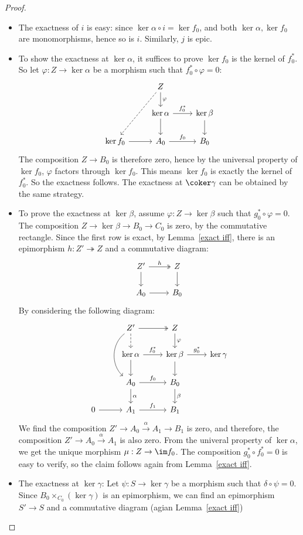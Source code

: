 \begin{proof}
\begin{itemize}
\item The exactness of $i$ is easy: since  $\ker\alpha\circ i=\ker f_0$, and both $\ker\alpha,\ker f_0$ are monomorphisms, hence so is $i$. Similarly, $j$ is epic.
\item To show the exactness at $\ker\alpha$, it suffices to prove $\ker f_0$ is the kernel of $f_0^*$. So let $\varphi:Z\to\ker\alpha$ be a morphism such that $f_0^*\circ\varphi=0$:
\[\begin{tikzcd}
&Z\ar[d,"\varphi"]\ar[ddl,dashed]&\\
&\ker\alpha\ar[r,"f_0^*"]\ar[d]&\ker\beta\ar[d]\\
\ker f_0\ar[r]&A_0\ar[r,"f_0"]&B_0
\end{tikzcd}\]
The composition $Z\to B_0$ is therefore zero, hence by the universal property of $\ker f_0$, $\varphi$ factors through $\ker f_0$. This means $\ker f_0$ is exactly the kernel of $f_0^*$. So the exactness follows. The exactness at $\coker\gamma$ can be obtained by the same strategy.
\item To prove the exactness at $\ker\beta$, assume $\varphi:Z\to\ker\beta$ such that $g_0^*\circ\varphi=0$. The composition $Z\to\ker\beta\to B_0\to C_0$ is zero, by the commutative rectangle. Since the first row is exact, by Lemma~\ref{exact iff}, there is an epimorphism $h:Z'\twoheadrightarrow Z$ and a commutative diagram:
\[\begin{tikzcd}
Z'\ar[d]\ar[r,twoheadrightarrow,"h"]&Z\ar[d]\\
A_0\ar[r]&B_0
\end{tikzcd}\]
By considering the following diagram:
\[\begin{tikzcd}
&Z'\ar[d,dashed]\ar[dd,bend right=50]\ar[r,twoheadrightarrow]&Z\ar[d,"\varphi"]&\\
&\ker\alpha\ar[d]\ar[r,"f_0^*"]&\ker\beta\ar[d]\ar[r,"g_0^*"]&\ker\gamma\\
&A_0\ar[d,"\alpha"]\ar[r,"f_0"]&B_0\ar[d,"\beta"]\\
0\ar[r]&A_1\ar[r,"f_1"]&B_1
\end{tikzcd}\]
We find the composition $Z'\to A_0\stackrel{\alpha}{\to}A_1\to B_1$ is zero, and therefore, the composition $Z'\to A_0\stackrel{\alpha}{\to}A_1$ is also zero. From the univeral property of $\ker\alpha$, we get the unique morphism $\mu:Z\to\im f_0$. The composition $g_0^*\circ f_0^*=0$ is easy to verify, so the claim follows again from Lemma~\ref{exact iff}.
\item The exactness at $\ker\gamma$: Let $\psi:S\to\ker\gamma$ be a morphism such that $\delta\circ\psi=0$. Since $B_0\times_{C_0}(\ker\gamma)$ is an epimorphism, we can find an epimorphism $S'\to S$ and a commutative diagram (agian Lemma~\ref{exact iff})

\end{itemize}
\end{proof}

